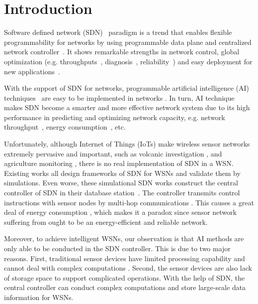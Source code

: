 \section{Introduction}


Software defined network (SDN)~\cite{Benzekki2016Software,Sezer2013Are} paradigm
is a trend that enables flexible programmability for networks 
by using programmable data plane and centralized network controller~\cite{7122247}.
It shows remarkable strengths in network control, global optimization 
(e.g. throughputs~\cite{}, diagnosis~\cite{}, reliability~\cite{})
and easy deployment for new applications~\cite{Feamster2014The}.

With the support of SDN for networks, programmable artificial intelligence (AI) 
techniques~\cite{Norvig1995Artificial, Poole2010Artificial, Cockburn1996ARCHON} 
are easy to be implemented in networks \cite{}.
In turn, AI technique makes SDN become a smarter and more effective network system
due to its high performance in predicting and optimizing network capacity\cite{},
e.g. network throughput~\cite{}, energy consumption~\cite{}, etc.
 
Unfortunately, although Internet of Things (IoTs) \cite{Atzori2010The} 
make wireless sensor networks \cite{Potdar2009Wireless}
extremely pervasive and important, such as volcanic investigation 
\cite{Wernerallen2006Deploying}, and agriculture monitoring \cite{Wang2010L3SN}, 
there is no real implementation of SDN in a WSN. Existing works 
 \cite{mahmud2011exploitation, costanzo2012software, luo2012sensor, de2015tinysdn, galluccio2015sdn} 
all design frameworks of SDN for WSNs and validate them by simulations.  
Even worse, these simulational SDN works construct the central controller 
of SDN in their database station~\cite{}. The controller transmits control 
instructions with sensor nodes by multi-hop communications \cite{Mizuyama2017Estimation}.
This causes a great deal of energy consumption \cite{Yang2014}, which 
makes it a paradox since sensor network suffering from ought to be an energy-efficient and reliable network.

Moreover, to achieve intelligent WSNs, 
our observation is that AI methods 
are only able to be conducted in the SDN controller. 
This is due to two major reasons. 
First, traditional sensor devices 
have limited processing capability and cannot 
deal with complex computations \cite{Sharma2012Security,Heller2012The}.
Second, the sensor devices are also lack of storage space 
to support complicated operations. With the help of SDN, 
the central controller can conduct complex computations 
and store large-scale data information for WSNs.


